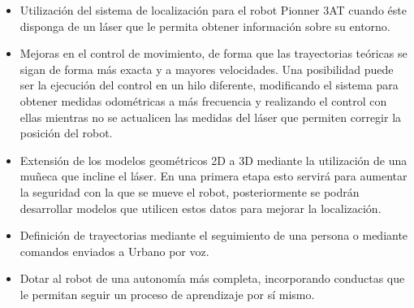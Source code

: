 \begin{itemize}
  \item Utilización del sistema de localización para el robot Pionner 3AT cuando éste disponga de un láser que le permita obtener información sobre su entorno.
  \item Mejoras en el control de movimiento, de forma que las trayectorias teóricas se sigan de forma más exacta y a mayores velocidades. Una posibilidad puede ser la ejecución del control en un hilo diferente, modificando el sistema para obtener medidas odométricas a más frecuencia y realizando el control con ellas mientras no se actualicen las medidas del láser que permiten corregir la posición del robot.
  \item Extensión de los modelos geométricos 2D a 3D mediante la utilización de una muñeca que incline el láser. En una primera etapa esto servirá para aumentar la seguridad con la que se mueve el robot, posteriormente se podrán desarrollar modelos que utilicen estos datos para mejorar la localización.
  \item Definición de trayectorias mediante el seguimiento de una persona o mediante comandos enviados a Urbano por voz.
  \item Dotar al robot de una autonomía más completa, incorporando conductas que le permitan seguir un proceso de aprendizaje por sí mismo.
\end{itemize}

